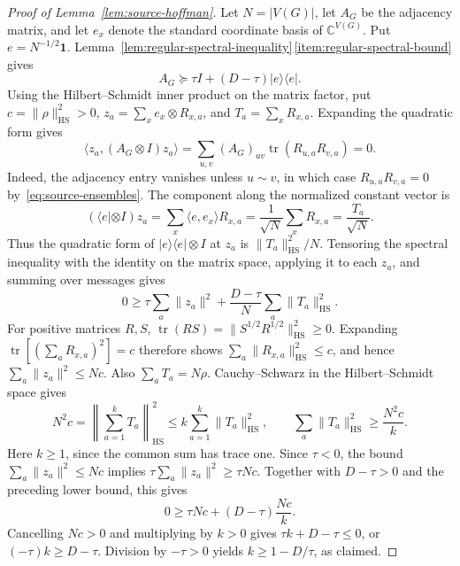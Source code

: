 \documentclass[11pt,a4paper]{article}
\numberwithin{equation}{section}
\numberwithin{figure}{section}
\numberwithin{table}{section}
\numberwithin{footnote}{section}
\theoremstyle{informal}\newtheorem*{informaltheorem}{Informal theorem}
\theoremstyle{definition}\newtheorem{example}{Example}[section]
\theoremstyle{remark}\newtheorem{remark}[theorem]{Remark}
\newcommand{\C}{\mathbb C}
\newcommand{\one}{\mathbf 1}
\newcommand{\tr}{\operatorname{tr}}
\newcommand{\HS}{\mathrm{HS}}
\begin{document}
\begin{proof}[Proof of Lemma~\ref{lem:source-hoffman}]
Let \(N=|V(G)|\), let \(A_G\) be the adjacency matrix, and let
\(e_x\) denote the standard coordinate basis of \(\C^{V(G)}\).
Put \(e=N^{-1/2}\one\).
Lemma~\ref{lem:regular-spectral-inequality}\,\ref{item:regular-spectral-bound}
gives
\begin{equation}
 A_G\succeq\tau I+(D-\tau)|e\rangle\langle e|.
\end{equation}
Using the Hilbert--Schmidt inner product on the matrix factor, put
\(c=\|\rho\|_{\HS}^2>0\),
\(z_a=\sum_x e_x\otimes R_{x,a}\), and \(T_a=\sum_xR_{x,a}\).
Expanding the quadratic form gives
\begin{equation}\label{eq:source-edge-quadratic}
 \langle z_a,(A_G\otimes I)z_a\rangle
 =\sum_{u,v}(A_G)_{uv}\tr(R_{u,a}R_{v,a})=0.
\end{equation}
Indeed, the adjacency entry vanishes unless \(u\sim v\), in which
case \(R_{u,a}R_{v,a}=0\) by~\eqref{eq:source-ensembles}.
The component along the normalized constant vector is
\begin{equation}\label{eq:source-constant-component}
 (\langle e|\otimes I)z_a
 =\sum_x\langle e,e_x\rangle R_{x,a}
 =\frac1{\sqrt N}\sum_xR_{x,a}
 =\frac{T_a}{\sqrt N}.
\end{equation}
Thus the quadratic form of
\(|e\rangle\langle e|\otimes I\) at \(z_a\) is
\(\|T_a\|_{\HS}^2/N\).
Tensoring the spectral inequality with the identity on the matrix
space, applying it to each \(z_a\), and summing over messages gives
\begin{equation}
 0\geq\tau\sum_a\|z_a\|^2
       +\frac{D-\tau}{N}\sum_a\|T_a\|_{\HS}^2.
\end{equation}
For positive matrices \(R,S\),
\(\tr(RS)=\|S^{1/2}R^{1/2}\|_{\HS}^2\geq0\).
Expanding \(\tr[(\sum_aR_{x,a})^2]=c\) therefore shows
\(\sum_a\|R_{x,a}\|_{\HS}^2\leq c\), and hence
\(\sum_a\|z_a\|^2\leq Nc\).
Also \(\sum_aT_a=N\rho\). Cauchy--Schwarz in the
Hilbert--Schmidt space gives
\begin{equation}\label{eq:source-message-cauchy-schwarz}
 N^2c=\left\|\sum_{a=1}^kT_a\right\|_{\HS}^2
 \leq k\sum_{a=1}^k\|T_a\|_{\HS}^2,
 \qquad
 \sum_a\|T_a\|_{\HS}^2\geq\frac{N^2c}{k}.
\end{equation}
Here \(k\geq1\), since the common sum has trace one.
Since \(\tau<0\), the bound \(\sum_a\|z_a\|^2\leq Nc\)
implies \(\tau\sum_a\|z_a\|^2\geq\tau Nc\).
Together with \(D-\tau>0\) and the preceding lower bound, this gives
\begin{equation}
 0\geq \tau Nc+(D-\tau)\frac{Nc}{k}.
\end{equation}
Cancelling \(Nc>0\) and multiplying by \(k>0\) gives
\(\tau k+D-\tau\leq0\), or
\((-\tau)k\geq D-\tau\). Division by \(-\tau>0\) yields
\(k\geq1-D/\tau\), as claimed.
\end{proof}
\end{document}
